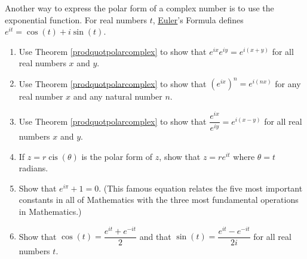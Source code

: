 { \label{eulerformulaexercise} Another way to express the polar form of a complex number is to use the exponential function.  For real numbers $t$, \href{http://en.wikipedia.org/wiki/Leonhard_Euler}{\underline{Euler}}'s Formula defines $e^{it} = \cos(t) + i \sin(t)$.  
\begin{enumerate} 
\item  Use Theorem \ref{prodquotpolarcomplex} to show that $e^{ix} e^{iy} = e^{i(x+y)}$ for all real numbers $x$ and $y$. 
\item  Use Theorem \ref{prodquotpolarcomplex} to show that $\left(e^{ix}\right)^{n} = e^{i(nx)}$ for any real number $x$ and any natural number $n$. 
\item  Use Theorem \ref{prodquotpolarcomplex} to show that $\dfrac{e^{ix}}{e^{iy}} = e^{i(x-y)}$ for all real numbers $x$ and $y$. 
\item  If $z = r\operatorname{cis}(\theta)$ is the polar form of $z$, show that $z = re^{it}$ where $\theta = t$ radians. 
\item  Show that $e^{i\pi} + 1 = 0$.  (This famous equation relates the five most important constants in all of Mathematics with the three most fundamental operations in Mathematics.) 
\item   \label{expformcosandsin} Show that $\cos(t) = \dfrac{e^{it} + e^{-it}}{2}$ and that $\sin(t) = \dfrac{e^{it} - e^{-it}}{2i}$ for all real numbers $t$. 
\end{enumerate}}
{}
